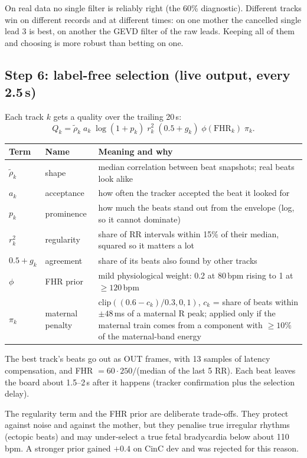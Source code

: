 \documentclass[11pt]{article}
\begin{document}
\begin{simple}
On real data no single filter is reliably right (the 60\% diagnostic). Different tracks win on different records and at different times: on one mother the cancelled single lead 3 is best, on another the GEVD filter of the raw leads. Keeping all of them and choosing is more robust than betting on one.
\end{simple}

\subsection{Step 6: label-free selection (live output, every 2.5\,s)}
Each track $k$ gets a quality over the trailing 20\,s:
\[
Q_k = \tilde{\rho}_k \; a_k \; \log(1 + p_k)\; r_k^2 \;(0.5 + g_k)\; \phi(\text{FHR}_k)\; \pi_k .
\]
\begin{center}
\small
\begin{tabularx}{\linewidth}{@{}l l X@{}}
\toprule
\textbf{Term} & \textbf{Name} & \textbf{Meaning and why} \\
\midrule
$\tilde{\rho}_k$ & shape & median correlation between beat snapshots; real beats look alike \\
$a_k$ & acceptance & how often the tracker accepted the beat it looked for \\
$p_k$ & prominence & how much the beats stand out from the envelope (log, so it cannot dominate) \\
$r_k^2$ & regularity & share of RR intervals within 15\% of their median, squared so it matters a lot \\
$0.5 + g_k$ & agreement & share of its beats also found by other tracks \\
$\phi$ & FHR prior & mild physiological weight: 0.2 at 80\,bpm rising to 1 at $\ge 120$\,bpm \\
$\pi_k$ & maternal penalty & $\text{clip}((0.6 - c_k)/0.3, 0, 1)$, $c_k$ = share of beats within $\pm48$\,ms of a maternal R peak; applied only if the maternal train comes from a component with $\ge 10\%$ of the maternal-band energy \\
\bottomrule
\end{tabularx}
\end{center}
The best track's beats go out as OUT frames, with 13 samples of latency compensation, and FHR $= 60\cdot250/$(median of the last 5 RR). Each beat leaves the board about 1.5--2\,s after it happens (tracker confirmation plus the selection delay).

\begin{warn}
The regularity term and the FHR prior are deliberate trade-offs. They protect against noise and against the mother, but they penalise true irregular rhythms (ectopic beats) and may under-select a true fetal bradycardia below about 110\,bpm. A stronger prior gained $+0.4$ on CinC dev and was rejected for this reason.
\end{warn}
\end{document}
